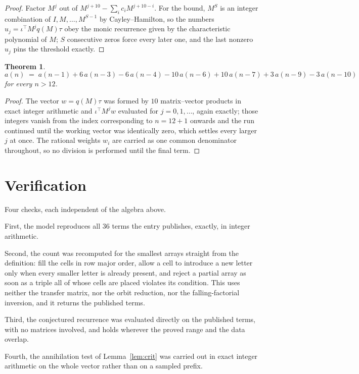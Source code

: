 \documentclass[11pt,a4paper]{article}
\theoremstyle{plain}
\newtheorem{theorem}{Theorem}
\theoremstyle{definition}
\begin{document}
\begin{proof}
Factor $M^{j}$ out of $M^{j+10}-\sum_ic_iM^{j+10-i}$. For the bound, $M^{S}$
is an integer combination of $I,M,\dots,M^{S-1}$ by Cayley--Hamilton, so the numbers
$u_j=\iota^{\!\top}M^{j}q(M)\tau$ obey the monic recurrence given by the characteristic
polynomial of $M$; $S$ consecutive zeros force every later one, and the last nonzero $u_j$
pins the threshold exactly.
\end{proof}

\begin{theorem}
\[
a(n)\;=\;a(n-1) + 6\,a(n-3) - 6\,a(n-4) - 10\,a(n-6) + 10\,a(n-7) + 3\,a(n-9) - 3\,a(n-10)
\]
for every $n>12$.
\end{theorem}

\begin{proof}
The vector $w=q(M)\tau$ was formed by $10$ matrix--vector products in exact integer
arithmetic and $\iota^{\!\top}M^{j}w$ evaluated for $j=0,1,\dots$, again exactly; those
integers vanish from the index corresponding to $n=12+1$ onwards and the run continued
until the working vector was identically zero, which settles every larger $j$ at once. The
rational weights $w_i$ are carried as one common denominator throughout, so no division is
performed until the final term.
\end{proof}

\section{Verification}

Four checks, each independent of the algebra above.

First, the model reproduces all $36$ terms the entry publishes, exactly, in integer
arithmetic.

Second, the count was recomputed for the smallest arrays straight from the definition: fill the
cells in row major order, allow a cell to introduce a new letter only when every smaller letter
is already present, and reject a partial array as soon as a triple all of whose cells are
placed violates its condition. This uses neither the transfer matrix, nor the orbit reduction,
nor the falling-factorial inversion, and it returns the published terms.

Third, the conjectured recurrence was evaluated directly on the published terms, with no
matrices involved, and holds wherever the proved range and the data overlap.

Fourth, the annihilation test of Lemma~\ref{lem:crit} was carried out in exact integer
arithmetic on the whole vector rather than on a sampled prefix.
\end{document}
